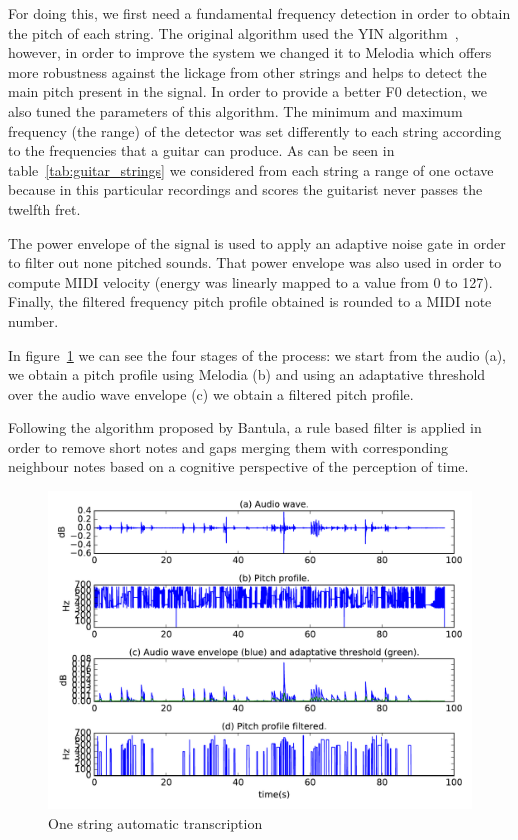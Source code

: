 For doing this, we first need a fundamental frequency detection in order to obtain the pitch of each string. The original algorithm used the YIN algorithm~\cite{Cheveigne2002}, however, in order to improve the system we changed it to Melodia which offers more robustness against the lickage from other strings and helps to detect the main pitch present in the signal. In order to provide a better F0 detection, we also tuned the parameters of this algorithm. The minimum and maximum frequency (the range) of the detector was set differently to each string according to the frequencies that a guitar can produce. As can be seen in table~\ref{tab:guitar_strings} we considered from each string a range of one octave because in this particular recordings and scores the guitarist never passes the twelfth fret.


The power envelope of the signal is used to apply an adaptive noise gate in order to filter out none pitched sounds. That power envelope was also used in order to compute MIDI velocity (energy was linearly mapped to a value from 0 to 127). Finally, the filtered frequency pitch profile obtained is rounded to a MIDI note number.

In figure~\ref{fig:transcription} we can see the four stages of the process: we start from the audio (a), we obtain a pitch profile using Melodia (b) and using an adaptative threshold over the audio wave envelope (c) we obtain a filtered pitch profile.

Following the algorithm proposed by Bantula, a rule based filter is applied in order to remove short notes and gaps merging them with corresponding neighbour notes based on a cognitive perspective of the perception of time.

\begin{figure}[ht!]
\caption{One string automatic transcription}
\label{fig:transcription}
\centering
\includegraphics[width=\textwidth]{Figures/transcription.pdf}
\end{figure}


